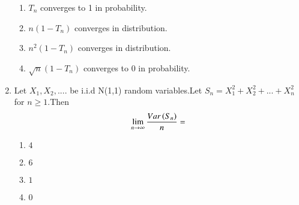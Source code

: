 \begin{enumerate}[label=\thesection.\arabic*.,ref=\thesection.\theenumi]
\begin{enumerate}
    \item $T_{n}$ converges to 1 in probability.
    \item $n(1-T_{n})$ converges in distribution.
    \item $n^{2}(1-T_{n})$ converges in distribution.
    \item $\sqrt{n}(1-T_{n})$ converges to 0 in probability.
\end{enumerate}
%
\solution


\item Let $X_{1},X_{2},....$ be i.i.d N(1,1) random variables.Let $S_{n}=X_{1}^{2}+X_{2}^2+...+X_{n}^{2}$ for $n\ge1$.Then $$\lim_{n \to \infty}{\frac{Var\left(S_{n}\right)}{n}}=$$
\begin{enumerate}[label = (\Alph*)]
\item  $4$
\item  $6$
\item  $1$
\item  $0$
\end{enumerate}

%
\end{enumerate}